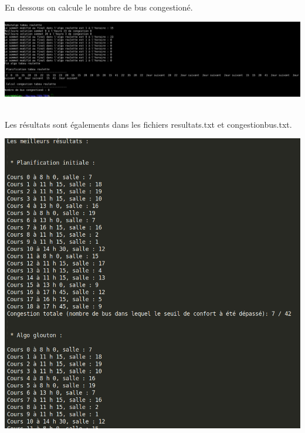 \documentclass[a4paper,11pt]{article}
\begin{document}
 			En dessous on calcule le nombre de bus congestioné. \\
 			\centerline{\includegraphics[scale=0.2]{Captures/terminal2.png}}\\
 			Les résultats sont égalements dans les fichiers resultats.txt et congestionbus.txt.\\
 			\centerline{\includegraphics[scale=0.2]{Captures/resultat1.png}}\\
\end{document}
